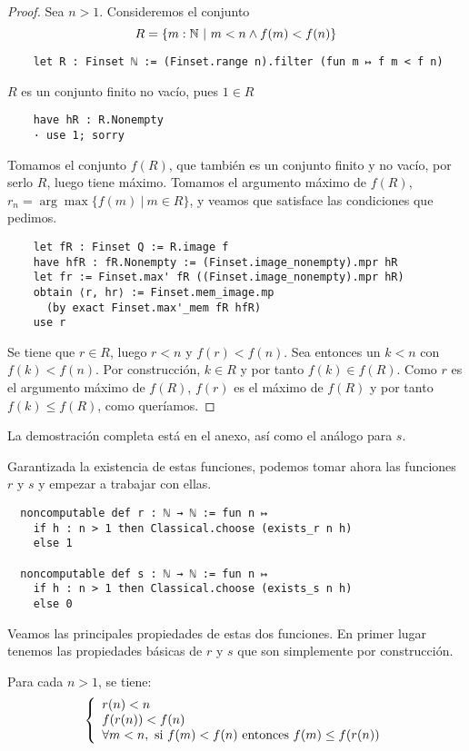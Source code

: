 \begin{proof}
  Sea $n>1$. Consideremos el conjunto
  $$
  R = \{m : \mathbb{N} ~|~ m < n \land f(m) < f(n)\}
  $$
  \begin{lstlisting}
    let R : Finset ℕ := (Finset.range n).filter (fun m ↦ f m < f n) \end{lstlisting}
  $R$ es un conjunto finito no vacío, pues $1 \in R$
  \begin{lstlisting}
    have hR : R.Nonempty
    · use 1; sorry \end{lstlisting}

  Tomamos el conjunto $f(R)$, que también es un conjunto finito y no vacío, por serlo $R$, luego tiene máximo. Tomamos el argumento máximo de $f(R)$, $r_n = \arg \max \{f(m) ~|~ m \in R\}$, y veamos que satisface las condiciones que pedimos.

  \begin{lstlisting}
    let fR : Finset Q := R.image f
    have hfR : fR.Nonempty := (Finset.image_nonempty).mpr hR
    let fr := Finset.max' fR ((Finset.image_nonempty).mpr hR)
    obtain ⟨r, hr⟩ := Finset.mem_image.mp
      (by exact Finset.max'_mem fR hfR)
    use r \end{lstlisting}

  Se tiene que $r \in R$, luego $r < n$ y $f(r) < f(n)$. Sea entonces un $k < n$ con $f(k) < f(n)$. Por construcción, $k \in R$ y por tanto $f(k) \in f(R)$. Como $r$ es el argumento máximo de $f(R)$, $f(r)$ es el máximo de $f(R)$ y por tanto $f(k) \leq f(R)$, como queríamos.
\end{proof}

La demostración completa está en el anexo, así como el análogo para $s$.

Garantizada la existencia de estas funciones, podemos tomar ahora las funciones $r$ y $s$ y empezar a trabajar con ellas.

\begin{lstlisting}
  noncomputable def r : ℕ → ℕ := fun n ↦
    if h : n > 1 then Classical.choose (exists_r n h)
    else 1

  noncomputable def s : ℕ → ℕ := fun n ↦
    if h : n > 1 then Classical.choose (exists_s n h)
    else 0
\end{lstlisting}

Veamos las principales propiedades de estas dos funciones. En primer lugar tenemos las propiedades básicas de $r$ y $s$ que son simplemente por construcción.

\begin{lemma}
  Para cada $n > 1$, se tiene:
  $$
  \left\{
    \begin{array}{l}
      r(n) < n \\
      f(r(n)) < f (n) \\
      \forall m < n, \textnormal{ si } f(m) < f(n) \textnormal{ entonces } f(m) \leq f(r(n))
    \end{array}
  \right.
  $$
\end{lemma}

